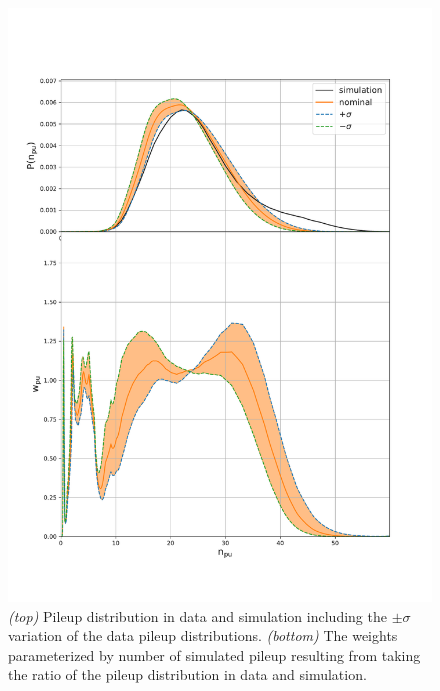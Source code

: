 \begin{figure}[ht]
    \centering
    \includegraphics[height=0.5\textheight]{chapters/Analysis/sectionCalibration/figures/generator/pileup_systematics}
    \caption{\emph{(top)} Pileup distribution in data and simulation including the $\pm\sigma$ variation of the data pileup distributions. \emph{(bottom)} The weights parameterized by number of simulated pileup resulting from taking the ratio of the pileup distribution in data and simulation. }
    \label{fig:analysis:calibration:pileup}
\end{figure}
\FloatBarrier



